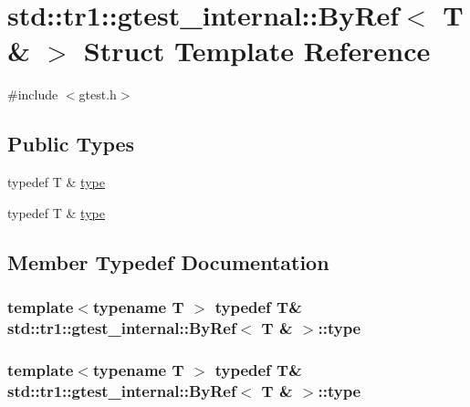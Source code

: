 \hypertarget{structstd_1_1tr1_1_1gtest__internal_1_1_by_ref_3_01_t_01_6_01_4}{\section{std\-:\-:tr1\-:\-:gtest\-\_\-internal\-:\-:By\-Ref$<$ T \& $>$ Struct Template Reference}
\label{structstd_1_1tr1_1_1gtest__internal_1_1_by_ref_3_01_t_01_6_01_4}
}


{\ttfamily \#include $<$gtest.\-h$>$}

\subsection*{Public Types}
\begin{DoxyCompactItemize}
\item 
typedef T \& \hyperlink{structstd_1_1tr1_1_1gtest__internal_1_1_by_ref_3_01_t_01_6_01_4_a512382574dbdd736320d68e313801122}{type}
\item 
typedef T \& \hyperlink{structstd_1_1tr1_1_1gtest__internal_1_1_by_ref_3_01_t_01_6_01_4_a512382574dbdd736320d68e313801122}{type}
\end{DoxyCompactItemize}


\subsection{Member Typedef Documentation}
\hypertarget{structstd_1_1tr1_1_1gtest__internal_1_1_by_ref_3_01_t_01_6_01_4_a512382574dbdd736320d68e313801122}{
\subsubsection[{type}]{\setlength{\rightskip}{0pt plus 5cm}template$<$typename T $>$ typedef T\& {\bf std\-::tr1\-::gtest\-\_\-internal\-::\-By\-Ref}$<$ T \& $>$\-::{\bf type}}}\label{structstd_1_1tr1_1_1gtest__internal_1_1_by_ref_3_01_t_01_6_01_4_a512382574dbdd736320d68e313801122}
\hypertarget{structstd_1_1tr1_1_1gtest__internal_1_1_by_ref_3_01_t_01_6_01_4_a512382574dbdd736320d68e313801122}{
\subsubsection[{type}]{\setlength{\rightskip}{0pt plus 5cm}template$<$typename T $>$ typedef T\& {\bf std\-::tr1\-::gtest\-\_\-internal\-::\-By\-Ref}$<$ T \& $>$\-::{\bf type}}}\label{structstd_1_1tr1_1_1gtest__internal_1_1_by_ref_3_01_t_01_6_01_4_a512382574dbdd736320d68e313801122}


